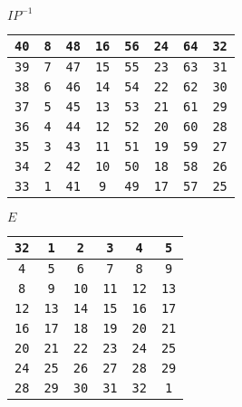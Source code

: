 \documentclass{article}
\begin{document}
  \begin{center}
	$IP^{-1}$ \\
	\vspace{10pt}
	\begin{tabular}{|cccccccc|}
	  \hline
\texttt{40} & \texttt{8} & \texttt{48} & \texttt{16} & \texttt{56} & \texttt{24} & \texttt{64} & \texttt{32} \\
	  \hline
\texttt{39} & \texttt{7} & \texttt{47} & \texttt{15} & \texttt{55} & \texttt{23} & \texttt{63} & \texttt{31} \\
	  \hline
\texttt{38} & \texttt{6} & \texttt{46} & \texttt{14} & \texttt{54} & \texttt{22} & \texttt{62} & \texttt{30} \\
	  \hline
\texttt{37} & \texttt{5} & \texttt{45} & \texttt{13} & \texttt{53} & \texttt{21} & \texttt{61} & \texttt{29} \\
	  \hline
\texttt{36} & \texttt{4} & \texttt{44} & \texttt{12} & \texttt{52} & \texttt{20} & \texttt{60} & \texttt{28} \\
	  \hline
\texttt{35} & \texttt{3} & \texttt{43} & \texttt{11} & \texttt{51} & \texttt{19} & \texttt{59} & \texttt{27} \\
	  \hline
\texttt{34} & \texttt{2} & \texttt{42} & \texttt{10} & \texttt{50} & \texttt{18} & \texttt{58} & \texttt{26} \\
	  \hline
\texttt{33} & \texttt{1} & \texttt{41} & \texttt{9} & \texttt{49} & \texttt{17} & \texttt{57} & \texttt{25}  \\
	  \hline
  \end{tabular}
  \end{center}

  \begin{center}
	$E$ \\
	\vspace{5pt}
	\begin{tabular}{|cccccc|}
	  \hline
	  \texttt{32} & \texttt{1} & \texttt{2} & \texttt{3} & \texttt{4} & \texttt{5} \\
	  \hline
	  \texttt{4} & \texttt{5} & \texttt{6} & \texttt{7} & \texttt{8} & \texttt{9} \\
	  \hline
	  \texttt{8} & \texttt{9} & \texttt{10} & \texttt{11} & \texttt{12} & \texttt{13} \\
	  \hline
	  \texttt{12} & \texttt{13} & \texttt{14} & \texttt{15} & \texttt{16} & \texttt{17} \\
	  \hline
	  \texttt{16} & \texttt{17} & \texttt{18} & \texttt{19} & \texttt{20} & \texttt{21} \\
	  \hline
	  \texttt{20} & \texttt{21} & \texttt{22} & \texttt{23} & \texttt{24} & \texttt{25} \\
	  \hline
	  \texttt{24} & \texttt{25} & \texttt{26} & \texttt{27} & \texttt{28} & \texttt{29} \\
	  \hline
	  \texttt{28} & \texttt{29} & \texttt{30} & \texttt{31} & \texttt{32} & \texttt{1} \\
	  \hline
	\end{tabular}
  \end{center}
\end{document}

